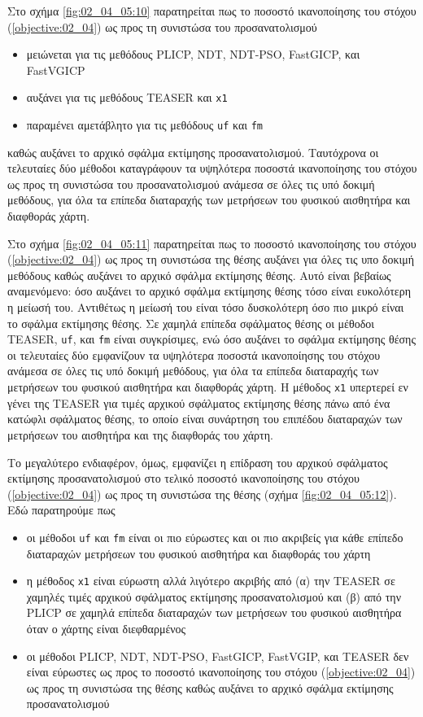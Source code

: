 Στο σχήμα \ref{fig:02_04_05:10} παρατηρείται πως το ποσοστό ικανοποίησης του
στόχου (\ref{objective:02_04}) ως προς τη συνιστώσα του προσανατολισμού
\begin{itemize}
  \item μειώνεται για τις μεθόδους PLICP, NDT, NDT-PSO, FastGICP, και FastVGICP
  \item αυξάνει για τις μεθόδους TEASER και \texttt{x1}
  \item παραμένει αμετάβλητο για τις μεθόδους \texttt{uf} και \texttt{fm}
\end{itemize}
καθώς αυξάνει το αρχικό σφάλμα εκτίμησης προσανατολισμού. Ταυτόχρονα οι
τελευταίες δύο μέθοδοι καταγράφουν τα υψηλότερα ποσοστά ικανοποίησης του στόχου
ως προς τη συνιστώσα του προσανατολισμού ανάμεσα σε όλες τις υπό δοκιμή
μεθόδους, για όλα τα επίπεδα διαταραχής των μετρήσεων του φυσικού αισθητήρα και
διαφθοράς χάρτη.

Στο σχήμα \ref{fig:02_04_05:11} παρατηρείται πως το ποσοστό ικανοποίησης του
στόχου (\ref{objective:02_04}) ως προς τη συνιστώσα της θέσης αυξάνει για όλες
τις υπο δοκιμή μεθόδους καθώς αυξάνει το αρχικό σφάλμα εκτίμησης θέσης. Αυτό
είναι βεβαίως αναμενόμενο: όσο αυξάνει το αρχικό σφάλμα εκτίμησης θέσης τόσο
είναι ευκολότερη η μείωσή του. Αντιθέτως η μείωσή του είναι τόσο δυσκολότερη
όσο πιο μικρό είναι το σφάλμα εκτίμησης θέσης. Σε χαμηλά επίπεδα σφάλματος
θέσης οι μέθοδοι TEASER, \texttt{uf}, και \texttt{fm} είναι συγκρίσιμες, ενώ
όσο αυξάνει το σφάλμα εκτίμησης θέσης οι τελευταίες δύο εμφανίζουν τα υψηλότερα
ποσοστά ικανοποίησης του στόχου ανάμεσα σε όλες τις υπό δοκιμή μεθόδους, για
όλα τα επίπεδα διαταραχής των μετρήσεων του φυσικού αισθητήρα και διαφθοράς
χάρτη. Η μέθοδος \texttt{x1} υπερτερεί εν γένει της TEASER για τιμές
αρχικού σφάλματος εκτίμησης θέσης πάνω από ένα κατώφλι σφάλματος θέσης, το οποίο
είναι συνάρτηση του επιπέδου διαταραχών των μετρήσεων του αισθητήρα και της
διαφθοράς του χάρτη.

Το μεγαλύτερο ενδιαφέρον, όμως, εμφανίζει η επίδραση του αρχικού σφάλματος
εκτίμησης προσανατολισμού στο τελικό ποσοστό ικανοποίησης του στόχου
(\ref{objective:02_04}) ως προς τη συνιστώσα της θέσης (σχήμα
\ref{fig:02_04_05:12}). Εδώ παρατηρούμε πως

\begin{itemize}
  \item οι μέθοδοι \texttt{uf} και \texttt{fm} είναι οι πιο εύρωστες και οι πιο
        ακριβείς για κάθε επίπεδο διαταραχών μετρήσεων του φυσικού αισθητήρα
        και διαφθοράς του χάρτη
  \item η μέθοδος \texttt{x1} είναι εύρωστη αλλά λιγότερο ακριβής από (α) την
        TEASER σε χαμηλές τιμές αρχικού σφάλματος εκτίμησης προσανατολισμού και
        (β) από την PLICP σε χαμηλά επίπεδα διαταραχών των μετρήσεων του φυσικού
        αισθητήρα όταν ο χάρτης είναι διεφθαρμένος
  \item οι μέθοδοι PLICP, NDT, NDT-PSO, FastGICP, FastVGIP, και TEASER δεν είναι
        εύρωστες ως προς το ποσοστό ικανοποίησης του στόχου
        (\ref{objective:02_04}) ως προς τη συνιστώσα της θέσης καθώς αυξάνει το
        αρχικό σφάλμα εκτίμησης προσανατολισμού
\end{itemize}

